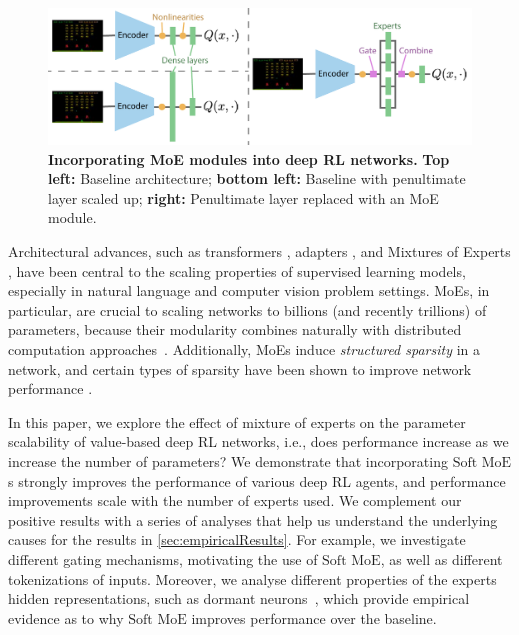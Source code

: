 \documentclass{article}
\theoremstyle{plain}
\theoremstyle{definition}
\theoremstyle{remark}
\newcommand{\softmoe}{$\textrm{Soft MoE}$}
\begin{document}
\ifarxiv
\else
    \begin{figure}[!t]
        \centering
        \includegraphics[width=\linewidth]{figures/moeArchitecture.pdf}
        \caption{{\bf Incorporating MoE modules into deep RL networks.} {\bf Top left:} Baseline architecture; {\bf bottom left:} Baseline with penultimate layer scaled up; {\bf right:} Penultimate layer replaced with an MoE module.}
        \label{fig:moeArchitecture}%
        \vspace{-0.1cm}
    \end{figure}
\fi

Architectural advances, such as transformers \citep{vaswani2017attention}, adapters \citep{houlsby19parameter}, and Mixtures of Experts \citep[MoEs;][]{shazeer2017outrageously}, have been central to the scaling properties of supervised learning models, especially in natural language and computer vision problem settings. MoEs, in particular, are crucial to scaling networks to billions (and recently trillions) of parameters, because their modularity combines naturally with distributed computation approaches~\citep{fedus2022switch}. Additionally, MoEs induce {\em structured sparsity} in a network, and certain types of sparsity have been shown to improve network performance \citep{evci2020rigl,gale2019state}.


In this paper, we explore the effect of mixture of experts on the parameter scalability of value-based deep RL networks, i.e., does performance increase as we increase the number of parameters? We demonstrate that incorporating \softmoe{}s \citep{puigcerver2023sparse} strongly improves the performance of various deep RL agents, and performance improvements scale with the number of experts used. We complement our positive results with a series of analyses that help us understand the underlying causes for the results in \cref{sec:empiricalResults}. For example, we investigate different gating mechanisms, motivating the use of \softmoe{}, as well as different tokenizations of inputs. Moreover, we analyse different properties of the experts hidden representations, such as dormant neurons~\citep{sokar2023dormant}, which provide empirical evidence as to why \softmoe{} improves performance over the baseline. 
\end{document}
